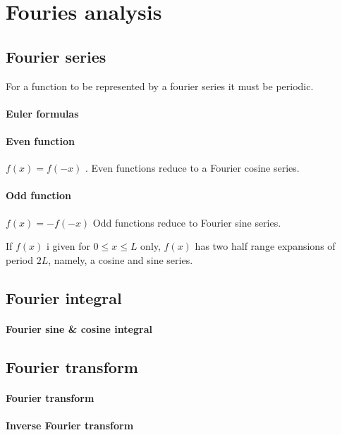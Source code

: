 \section{Fouries analysis}

\subsection{Fourier series}
For a function to be represented by a fourier series it must be
periodic.

\paragraph{Euler formulas}
\paragraph{Even function} $f(x) = f(-x)$ . Even functions reduce to a Fourier cosine series.
\paragraph{Odd function}  $f(x) = - f(-x)$ Odd functions reduce to
Fourier sine series.

If $f(x)$ i given for $0 \leq x \leq L$ only, $f(x)$ has two half
range expansions of period $2L$, namely, a cosine and sine series.

\subsection{Fourier integral}
\paragraph{Fourier sine \& cosine integral}

\subsection{Fourier transform}

\paragraph{Fourier transform}
\paragraph{Inverse Fourier transform}
